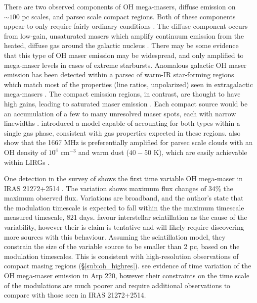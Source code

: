 There are two observed components of OH mega-masers, diffuse emission on $\sim 100$ pc scales, and parsec scale compact regions. Both of these components appear to only require fairly ordinary conditions \citep{lo2005}. The diffuse component occurs from low-gain, unsaturated masers which amplify continuum emission from the heated, diffuse gas around the galactic nucleus \citep[e.g.]{Baan_1985}. There may be some evidence that this type of OH maser emission may be widespread, and only amplified to mega-maser levels in cases of extreme starbursts. Anomalous galactic OH maser emission has been detected within a parsec of warm-IR star-forming regions which match most of the properties (line ratios, unpolarized) seen in extragalactic mega-masers \cite{Mirabel_1989}.  The compact emission regions, in contrast, are thought to have high gains, leading to saturated maser emission \citep[e.g.,]{lonsdale2002}. Each compact source would be an accumulation of a few to many unresolved maser spots, each with narrow linewidths \citet{lo2005}.  \citet{Parra_2005} introduced a model capable of accounting for both types within a single gas phase, consistent with gas properties expected in these regions. \citet{randell1995} also show that the 1667 MHz is preferentially amplified for parsec scale clouds with an OH density of $10^4$ cm$^{-3}$ and warm dust ($40-50$ K), which are easily achievable within LIRGs \citep{lo2005}.

One detection in the survey of \citet{darling2002_paperIII} shows the first time variable OH mega-maser in IRAS 21272+2514 \citep[$z\sim 0.15$]{darling2002_timevar}. The variation shows maximum flux changes of 34\% the maximum observed flux. Variations are broadband, and the author's state that the modulation timescale is expected to fall within the the maximum timescale measured timescale, 821 days. \citet{darling2002_timevar} favour interstellar scintillation as the cause of the variability, however their is claim is tentative and will likely require discovering more sources with this behaviour. Assuming the scintillation model, they constrain the size of the variable source to be smaller than 2 pc, based on the modulation timescales. This is consistent with high-resolution observations of compact masing regions (\S\ref{sub:oh_highres}). \citet{Lonsdale_2007} see evidence of time variation of the OH mega-maser emission in Arp 220, however their constraints on the time scale of the modulations are much poorer and require additional observations to compare with those seen in IRAS 21272+2514.

